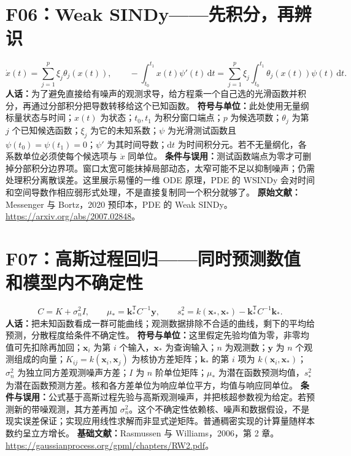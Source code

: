 \section{F06：Weak SINDy——先积分，再辨识}
\begin{equation}
 \dot x(t)=\sum_{j=1}^{p}\xi_j\theta_j(x(t)),\qquad
 -\int_{t_0}^{t_1}x(t)\psi'(t)\,\mathrm dt
 =\sum_{j=1}^{p}\xi_j\int_{t_0}^{t_1}\theta_j(x(t))\psi(t)\,\mathrm dt.
\end{equation}
\textbf{人话：}为了避免直接给有噪声的观测求导，给方程乘一个自己选的光滑函数并积分，再通过分部积分把导数转移给这个已知函数。
\textbf{符号与单位：}此处使用无量纲标量状态与时间；$x(t)$ 为状态；$t_0,t_1$ 为积分窗口端点；$p$ 为候选项数；$\theta_j$ 为第 $j$ 个已知候选函数；$\xi_j$ 为它的未知系数；$\psi$ 为光滑测试函数且 $\psi(t_0)=\psi(t_1)=0$；$\psi'$ 为其时间导数；$\mathrm dt$ 为时间积分元。若不无量纲化，各系数单位必须使每个候选项与 $\dot x$ 同单位。
\textbf{条件与误用：}测试函数端点为零才可删掉分部积分边界项。窗口太宽可能抹掉局部动态，太窄可能不足以抑制噪声；仍需处理积分离散误差。这里展示易懂的一维 ODE 原理，PDE 的 WSINDy 会对时间和空间导数作相应弱形式处理，不是直接复制同一个积分就够了。
\textbf{原始文献：}Messenger 与 Bortz，2020 预印本，PDE 的 Weak SINDy。\url{https://arxiv.org/abs/2007.02848}。

\section{F07：高斯过程回归——同时预测数值和模型内不确定性}
\begin{equation}
 C=K+\sigma_n^2I,\qquad
 \mu_*=\mathbf k_*^{\mathsf T}C^{-1}\mathbf y,\qquad
 s_*^2=k(\mathbf x_*,\mathbf x_*)-\mathbf k_*^{\mathsf T}C^{-1}\mathbf k_*.
\end{equation}
\textbf{人话：}把未知函数看成一群可能曲线；观测数据排除不合适的曲线，剩下的平均给预测，分散程度给条件不确定性。
\textbf{符号与单位：}这里假定先验均值为零，非零均值可先扣除再加回；$\mathbf x_i$ 为第 $i$ 个输入，$\mathbf x_*$ 为查询输入；$n$ 为观测数；$\mathbf y$ 为 $n$ 个观测组成的向量；$K_{ij}=k(\mathbf x_i,\mathbf x_j)$ 为核协方差矩阵；$\mathbf k_*$ 的第 $i$ 项为 $k(\mathbf x_i,\mathbf x_*)$；$\sigma_n^2$ 为独立同方差观测噪声方差；$I$ 为 $n$ 阶单位矩阵；$\mu_*$ 为潜在函数预测均值，$s_*^2$ 为潜在函数预测方差。核和各方差单位为响应单位平方，均值与响应同单位。
\textbf{条件与误用：}公式基于高斯过程先验与高斯观测噪声，并把核超参数视为给定。若预测新的带噪观测，其方差再加 $\sigma_n^2$。这个不确定性依赖核、噪声和数据假设，不是现实误差保证；实现应用线性求解而非显式逆矩阵。普通稠密实现的计算量随样本数约呈立方增长。
\textbf{基础文献：}Rasmussen 与 Williams，2006，第 2 章。\url{https://gaussianprocess.org/gpml/chapters/RW2.pdf}。

